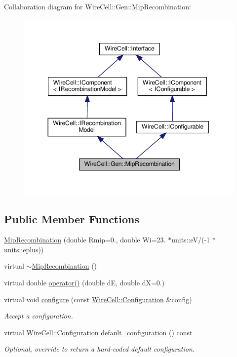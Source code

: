 Collaboration diagram for Wire\+Cell\+:\+:Gen\+:\+:Mip\+Recombination\+:
\nopagebreak
\begin{figure}[H]
\begin{center}
\leavevmode
\includegraphics[width=344pt]{class_wire_cell_1_1_gen_1_1_mip_recombination__coll__graph}
\end{center}
\end{figure}
\subsection*{Public Member Functions}
\begin{DoxyCompactItemize}
\item 
\hyperlink{class_wire_cell_1_1_gen_1_1_mip_recombination_a42989153604ef26d71dd3ca903bdea79}{Mip\+Recombination} (double Rmip=0., double Wi=23. $\ast$units\+::eV/(-\/1 $\ast$units\+::eplus))
\item 
virtual \hyperlink{class_wire_cell_1_1_gen_1_1_mip_recombination_a69ec5abf262661b198ee1faac84514c4}{$\sim$\+Mip\+Recombination} ()
\item 
virtual double \hyperlink{class_wire_cell_1_1_gen_1_1_mip_recombination_a894a0a8bfb306444d2cecfb3340e35c9}{operator()} (double dE, double dX=0.)
\item 
virtual void \hyperlink{class_wire_cell_1_1_gen_1_1_mip_recombination_a5fed946c2d21dfd6dcb1df1864eec0a1}{configure} (const \hyperlink{namespace_wire_cell_a9f705541fc1d46c608b3d32c182333ee}{Wire\+Cell\+::\+Configuration} \&config)
\begin{DoxyCompactList}\small\item\em Accept a configuration. \end{DoxyCompactList}\item 
virtual \hyperlink{namespace_wire_cell_a9f705541fc1d46c608b3d32c182333ee}{Wire\+Cell\+::\+Configuration} \hyperlink{class_wire_cell_1_1_gen_1_1_mip_recombination_aeef16da2540f00fb156d5d7506d27449}{default\+\_\+configuration} () const
\begin{DoxyCompactList}\small\item\em Optional, override to return a hard-\/coded default configuration. \end{DoxyCompactList}\end{DoxyCompactItemize}
